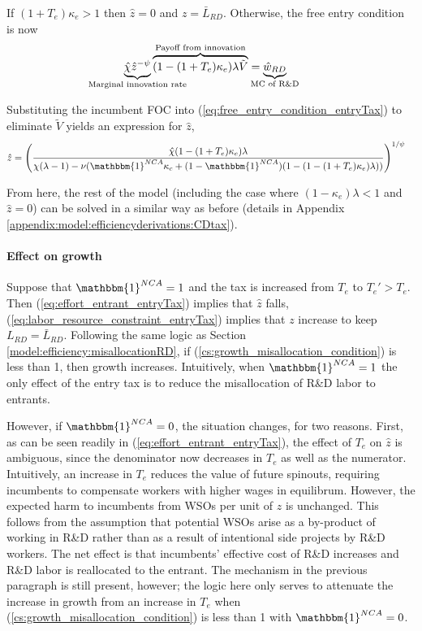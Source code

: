 \documentclass[11pt,english]{article}
\begin{document}
If $(1 + T_e) \kappa_e > 1$ then $\hat{z} = 0$ and $z = \bar{L}_{RD}$. Otherwise, the free entry condition is now
\begin{align}
\underbrace{\hat{\chi} \hat{z}^{-\psi}}_{\mathclap{\text{Marginal innovation rate}}} \overbrace{(1-(1+T_e)\kappa_e) \lambda \tilde{V}}^{\mathclap{\text{Payoff from innovation}}} &= \underbrace{\hat{w}_{RD}}_{\mathclap{\text{MC of R\&D}}} \label{eq:free_entry_condition_entryTax}
\end{align}

Substituting the incumbent FOC into (\ref{eq:free_entry_condition_entryTax}) to eliminate $\tilde{V}$ yields an expression for $\hat{z}$, 
\begin{align}
\hat{z} &= \Bigg( \frac{\hat{\chi} (1-(1+T_e)\kappa_{e}) \lambda}{\chi(\lambda -1) - \nu (\mathbbm{1}^{NCA}\kappa_c + (1-\mathbbm{1}^{NCA})(1 - (1-(1+T_e)\kappa_e)\lambda)) } \Bigg)^{1/\psi} \label{eq:effort_entrant_entryTax}
\end{align}

From here, the rest of the model (including the case where $(1-\kappa_e)\lambda < 1$ and $\hat{z} = 0$) can be solved in a similar way as before (details in Appendix \ref{appendix:model:efficiencyderivations:CDtax}). 

\paragraph{Effect on growth}

Suppose that $\mathbbm{1}^{NCA} = 1$ and the tax is increased from $T_e$ to $T_e' > T_e$. Then (\ref{eq:effort_entrant_entryTax}) implies that $\hat{z}$ falls, (\ref{eq:labor_resource_constraint_entryTax}) implies that $z$ increase to keep $L_{RD} = \bar{L}_{RD}$. Following the same logic as Section \ref{model:efficiency:misallocationRD}, if (\ref{cs:growth_misallocation_condition}) is less than 1, then growth increases. Intuitively, when $\mathbbm{1}^{NCA} = 1$ the only effect of the entry tax is to reduce the misallocation of R\&D labor to entrants. 

However, if $\mathbbm{1}^{NCA} = 0$, the situation changes, for two reasons. First, as can be seen readily in (\ref{eq:effort_entrant_entryTax}), the effect of $T_e$ on $\hat{z}$ is ambiguous, since the denominator now decreases in $T_e$ as well as the numerator. Intuitively, an increase in $T_e$ reduces the value of future spinouts, requiring incumbents to compensate workers with higher wages in equilibrum. However, the expected harm to incumbents from WSOs per unit of $z$ is unchanged. This follows from the assumption that potential WSOs arise as a by-product of working in R\&D rather than as a result of intentional side projects by R\&D workers. The net effect is that incumbents' effective cost of R\&D increases and R\&D labor is reallocated to the entrant. The mechanism in the previous paragraph is still present, however; the logic here only serves to attenuate the increase in growth from an increase in $T_e$ when (\ref{cs:growth_misallocation_condition}) is less than 1 with $\mathbbm{1}^{NCA} = 0$.
\end{document}
